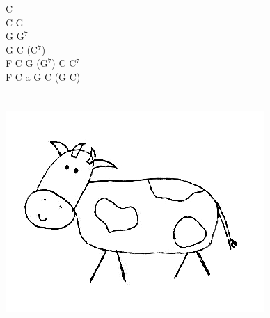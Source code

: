 \documentclass[a5paper, 10pt]{book}
\begin{document}
\begin{minipage}[t]{0.25\textwidth}
  C\\
  C G\\
  G G$^7$\\
  G C (C$^7$)\\

  F C G (G$^7$) C C$^7$\\
  F C a G C (G C)\\
  \\
  \\
  \includegraphics[width=\textwidth, angle=-15]{images/justysia.png}\\
\end{minipage}

\newpage
\end{document}
